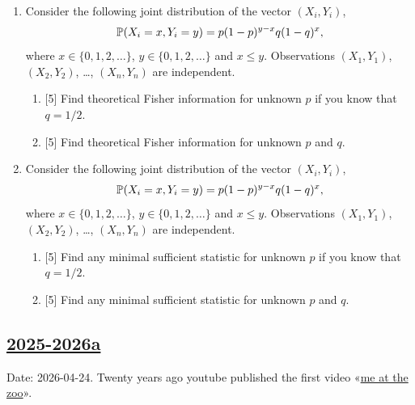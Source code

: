 \begin{enumerate}
\begin{enumerate}
    \item {[5]} Construct a likelihood ratio test for the hypothesis $H_0$: $p = q$ against alternative $p\neq q$.
\end{enumerate}

Reminder: clearly specify the distribution of $LR$-statistic under $H_0$ and describe the decision rule.

\item Consider the following joint distribution of the vector $(X_i, Y_i)$,
\[
\P(X_i = x, Y_i = y) = p(1-p)^{y-x}q(1-q)^{x},
\]
where $x \in \{0, 1, 2, \dots\}$, $y \in \{0, 1, 2, \dots \}$ and $x \leq y$. 
Observations $(X_1, Y_1)$, $(X_2, Y_2)$, \dots, $(X_n, Y_n)$ are independent.

\begin{enumerate}
    \item {[5]} Find theoretical Fisher information for unknown $p$ if you know that $q = 1/2$.
    \item {[5]} Find theoretical Fisher information for unknown $p$ and $q$. 
\end{enumerate}


\item Consider the following joint distribution of the vector $(X_i, Y_i)$,
\[
\P(X_i = x, Y_i = y) = p(1-p)^{y-x}q(1-q)^{x},
\]
where $x \in \{0, 1, 2, \dots\}$, $y \in \{0, 1, 2, \dots \}$ and $x \leq y$. 
Observations $(X_1, Y_1)$, $(X_2, Y_2)$, \dots, $(X_n, Y_n)$ are independent.

\begin{enumerate}
    \item {[5]} Find any minimal sufficient statistic for unknown $p$ if you know that $q = 1/2$.
    \item {[5]} Find any minimal sufficient statistic for unknown $p$ and $q$. 
\end{enumerate}



\end{enumerate}




\subsection[2025-2026a]{\hyperref[sec:sol_kr_04_2025_2026a]{2025-2026a}}
\label{sec:kr_04_2025_2026a} %

Date: 2026-04-24. 
Twenty years ago youtube published the first video «\href{https://www.youtube.com/watch?v=jNQXAC9IVRw}{me at the zoo}».

